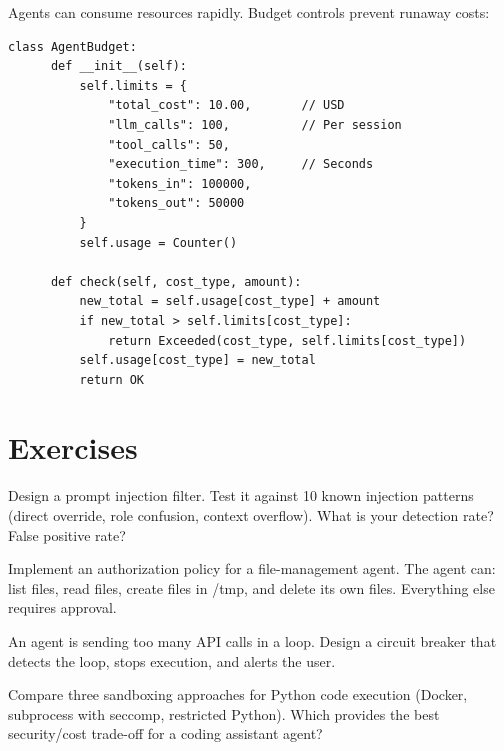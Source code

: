Agents can consume resources rapidly. Budget controls prevent runaway costs:

\begin{lstlisting}[caption=Agent budget enforcement]
  class AgentBudget:
      def __init__(self):
          self.limits = {
              "total_cost": 10.00,       // USD
              "llm_calls": 100,          // Per session
              "tool_calls": 50,
              "execution_time": 300,     // Seconds
              "tokens_in": 100000,
              "tokens_out": 50000
          }
          self.usage = Counter()

      def check(self, cost_type, amount):
          new_total = self.usage[cost_type] + amount
          if new_total > self.limits[cost_type]:
              return Exceeded(cost_type, self.limits[cost_type])
          self.usage[cost_type] = new_total
          return OK
\end{lstlisting}

\section{Exercises}

\begin{exercise}
	Design a prompt injection filter. Test it against 10 known injection patterns (direct override, role confusion, context overflow). What is your detection rate? False positive rate?
\end{exercise}

\begin{exercise}
	Implement an authorization policy for a file-management agent. The agent can: list files, read files, create files in /tmp, and delete its own files. Everything else requires approval.
\end{exercise}

\begin{exercise}
	An agent is sending too many API calls in a loop. Design a circuit breaker that detects the loop, stops execution, and alerts the user.
\end{exercise}

\begin{exercise}
	Compare three sandboxing approaches for Python code execution (Docker, subprocess with seccomp, restricted Python). Which provides the best security/cost trade-off for a coding assistant agent?
\end{exercise}
